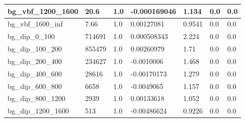 \documentclass[a4paper, 10pt]{article}
\begin{document}
\begin{table}[H]
\begin{center}
\begin{tabular}{|m{23.0mm}|m{23.0mm}|m{18.0mm}|m{19.0mm}|m{19.0mm}|m{19.0mm}|m{19.0mm}|}
      \hline
      {\cellcolor{white}         bg\_vbf\_1200\_1600}& {\cellcolor{white}         20.6}& {\cellcolor{white}         1.0}& {\cellcolor{white}         -0.000169046}& {\cellcolor{white}         1.134}& {\cellcolor{green}         0.0}& {\cellcolor{green}         0.0}\\
      \hline
      {\cellcolor{white}         bg\_vbf\_1600\_inf}& {\cellcolor{white}         7.66}& {\cellcolor{white}         1.0}& {\cellcolor{white}         0.00127081}& {\cellcolor{white}         0.9541}& {\cellcolor{green}         0.0}& {\cellcolor{green}         0.0}\\
      \hline
      {\cellcolor{white}         bg\_dip\_0\_100}& {\cellcolor{white}         714691}& {\cellcolor{white}         1.0}& {\cellcolor{white}         0.000508343}& {\cellcolor{white}         2.224}& {\cellcolor{green}         0.0}& {\cellcolor{green}         0.0}\\
      \hline
      {\cellcolor{white}         bg\_dip\_100\_200}& {\cellcolor{white}         855479}& {\cellcolor{white}         1.0}& {\cellcolor{white}         0.00260979}& {\cellcolor{white}         1.71}& {\cellcolor{green}         0.0}& {\cellcolor{green}         0.0}\\
      \hline
      {\cellcolor{white}         bg\_dip\_200\_400}& {\cellcolor{white}         234627}& {\cellcolor{white}         1.0}& {\cellcolor{white}         -0.0010006}& {\cellcolor{white}         1.468}& {\cellcolor{green}         0.0}& {\cellcolor{green}         0.0}\\
      \hline
      {\cellcolor{white}         bg\_dip\_400\_600}& {\cellcolor{white}         28616}& {\cellcolor{white}         1.0}& {\cellcolor{white}         -0.00170173}& {\cellcolor{white}         1.279}& {\cellcolor{green}         0.0}& {\cellcolor{green}         0.0}\\
      \hline
      {\cellcolor{white}         bg\_dip\_600\_800}& {\cellcolor{white}         6658}& {\cellcolor{white}         1.0}& {\cellcolor{white}         -0.0049065}& {\cellcolor{white}         1.157}& {\cellcolor{green}         0.0}& {\cellcolor{green}         0.0}\\
      \hline
      {\cellcolor{white}         bg\_dip\_800\_1200}& {\cellcolor{white}         2939}& {\cellcolor{white}         1.0}& {\cellcolor{white}         0.00133618}& {\cellcolor{white}         1.052}& {\cellcolor{green}         0.0}& {\cellcolor{green}         0.0}\\
      \hline
      {\cellcolor{white}         bg\_dip\_1200\_1600}& {\cellcolor{white}         513}& {\cellcolor{white}         1.0}& {\cellcolor{white}         -0.00486624}& {\cellcolor{white}         0.9226}& {\cellcolor{green}         0.0}& {\cellcolor{green}         0.0}\\

\end{tabular}
\end{center}
\end{table}
\end{document}
